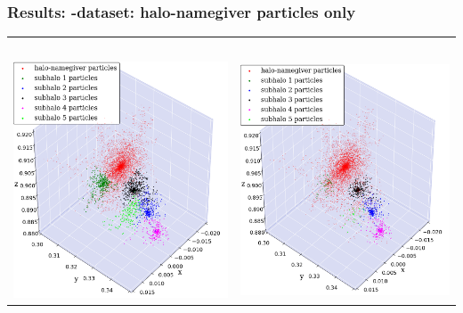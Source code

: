 \begin{frame}
	\frametitle{Results: \cosmo-dataset: halo-namegiver particles only}
	
	\begin{tabular}{c c}
		\phewon\ 	& \simple \\[1.5em]
		{\includegraphics[width = .49\textwidth]{../report/images/cosmo/cos-halo-66858-phew.png}} \hspace*{-1em} 	& 
		{\includegraphics[width = .49\textwidth]{../report/images/cosmo/cos-halo-66858-nosaddle.png}}
	\end{tabular}
\end{frame}



